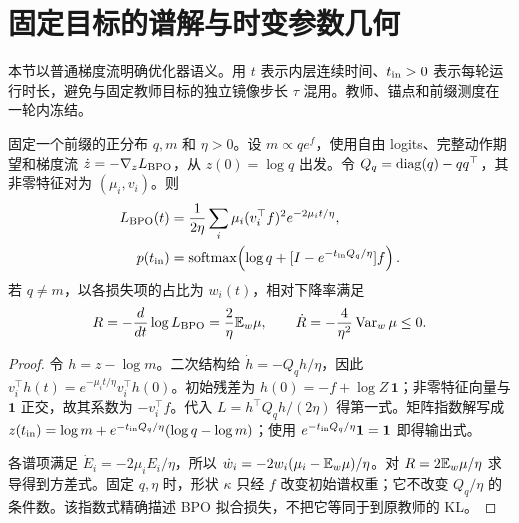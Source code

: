 \section{固定目标的谱解与时变参数几何}
\label{sec:spectral-dynamics}
本节以普通梯度流明确优化器语义。用 $t$ 表示内层连续时间、$t_{\rm in}>0$ 表示每轮运行时长，避免与固定教师目标的独立镜像步长 $\tau$ 混用。教师、锚点和前缀测度在一轮内冻结。

\begin{proposition}
\label{prop:bpo-spectral-map}
固定一个前缀的正分布 $q,m$ 和 $\eta>0$。设 $m\propto qe^f$，使用自由 logits、完整动作期望和梯度流 $\dot z=-\nabla_zL_{\rm BPO}$，从 $z(0)=\log q$ 出发。令 $Q_q=\operatorname{diag}(q)-qq^\top$，其非零特征对为 $(\mu_i,v_i)$。则
\begin{align}
L_{\rm BPO}(t)&=\frac1{2\eta}\sum_i\mu_i(v_i^\top f)^2e^{-2\mu_it/\eta},\\
p(t_{\rm in})&=\operatorname{softmax}\!\left(\log q+[I-e^{-t_{\rm in}Q_q/\eta}]f\right).
\end{align}
若 $q\ne m$，以各损失项的占比为 $w_i(t)$，相对下降率满足
\begin{equation}
R=-\frac d{dt}\log L_{\rm BPO}=\frac2\eta\mathbb E_w\mu,
\qquad \dot R=-\frac4{\eta^2}\operatorname{Var}_w\mu\le0.
\end{equation}
\end{proposition}
\begin{proof}
令 $h=z-\log m$。二次结构给 $\dot h=-Q_qh/\eta$，因此 $v_i^\top h(t)=e^{-\mu_it/\eta}v_i^\top h(0)$。初始残差为 $h(0)=-f+\log Z\,\mathbf1$；非零特征向量与 $\mathbf1$ 正交，故其系数为 $-v_i^\top f$。代入 $L=h^\top Q_qh/(2\eta)$ 得第一式。矩阵指数解写成 $z(t_{\rm in})=\log m+e^{-t_{\rm in}Q_q/\eta}(\log q-\log m)$；使用 $e^{-t_{\rm in}Q_q/\eta}\mathbf1=\mathbf1$ 即得输出式。

各谱项满足 $\dot E_i=-2\mu_iE_i/\eta$，所以 $\dot w_i=-2w_i(\mu_i-\mathbb E_w\mu)/\eta$。对 $R=2\mathbb E_w\mu/\eta$ 求导得到方差式。固定 $q,\eta$ 时，形状 $\kappa$ 只经 $f$ 改变初始谱权重；它不改变 $Q_q/\eta$ 的条件数。该指数式精确描述 BPO 拟合损失，不把它等同于到原教师的 KL。
\end{proof}

